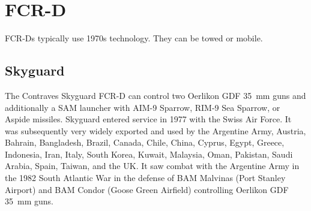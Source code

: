 \section{FCR-D}

\begin{withcounters}


    FCR-Ds typically use 1970s technology. They can be towed or mobile.


\end{withcounters}

\subsection{Skyguard}

The Contraves Skyguard FCR-D can control two Oerlikon GDF 35~mm guns and additionally a SAM launcher with AIM-9 Sparrow, RIM-9 Sea Sparrow, or Aspide missiles.
Skyguard entered service in 1977 with the Swiss Air Force.
It was subsequently very widely exported and used by the Argentine Army, Austria, Bahrain, Bangladesh, Brazil, Canada, Chile, China, Cyprus, Egypt, Greece, Indonesia, Iran, Italy, South Korea, Kuwait, Malaysia, Oman, Pakistan, Saudi Arabia, Spain, Taiwan, and the UK.
It saw combat with the Argentine Army in the 1982 South Atlantic War in the defense of BAM Malvinas (Port Stanley Airport) and BAM Condor (Goose Green Airfield) controlling Oerlikon GDF 35~mm guns.%

\begin{table}
    \centering
    \footnotesize
    
\end{table}
